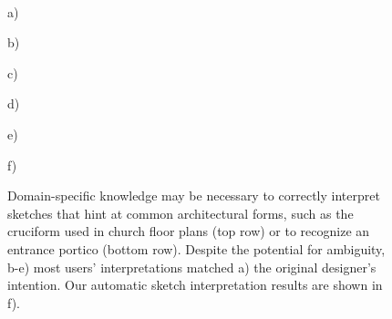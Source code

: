 \begin{figure}[t]
\vspace{-0.35in}
\\
\begin{minipage}{0.74in}\textcolor[rgb]{0,0,0}{\hspace{-0.01in} { a)}} \end{minipage}
\begin{minipage}{0.74in}\textcolor[rgb]{0,0,0}{\hspace{-0.01in} { b)}} \end{minipage}
\begin{minipage}{0.74in}\textcolor[rgb]{0,0,0}{\hspace{-0.01in} { c)}} \end{minipage}
\begin{minipage}{0.74in}\textcolor[rgb]{0,0,0}{\hspace{-0.01in} { d)}} \end{minipage}
\begin{minipage}{0.74in}\textcolor[rgb]{0,0,0}{\hspace{-0.01in} { e)}} \end{minipage}
\begin{minipage}{0.74in}\textcolor[rgb]{0,0,0}{\hspace{-0.01in} { f)}} \end{minipage}
\caption{Domain-specific knowledge may be necessary to correctly
  interpret sketches that hint at common architectural forms, such as
  the cruciform used in church floor plans (top row) or to recognize
  an entrance portico (bottom row).  Despite the potential for
  ambiguity, b-e) most users' interpretations matched a) the original
  designer's intention.  Our automatic sketch interpretation results
  are shown in f). }
\label{figure:domain_specific}
\end{figure}
